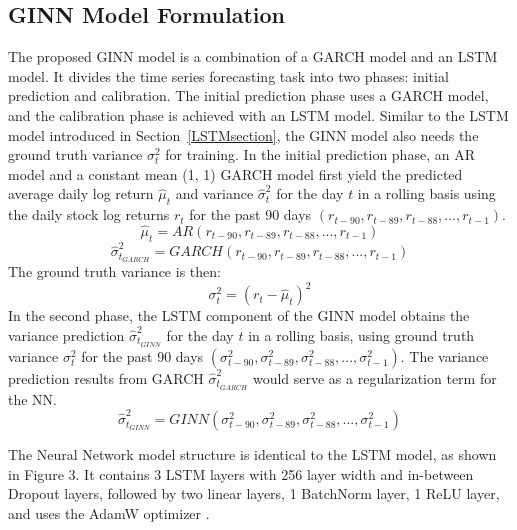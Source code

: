 \subsection{GINN Model Formulation}
The proposed GINN model is a combination of a GARCH model and an LSTM model. It divides the time series forecasting task into two phases: initial prediction and calibration. The initial prediction phase uses a GARCH model, and the calibration phase is achieved with an LSTM model. Similar to the LSTM model introduced in Section~\ref{LSTMsection}, the GINN model also needs the ground truth variance $\sigma_t^2$ for training. In the initial prediction phase, an AR model and a constant mean (1, 1) GARCH model first yield the predicted average daily log return $\hat{\mu}_t$ and variance $\hat{\sigma}_t^2$ for the day $t$ in a rolling basis using the daily stock log returns $r_t$ for the past 90 days $(r_{t-90},r_{t-89},r_{t-88},...,r_{t-1})$. 
\begin{equation}
    \hat{\mu}_t = AR (r_{t-90},r_{t-89},r_{t-88},...,r_{t-1}) 
\end{equation}
\begin{equation}
    \hat{\sigma}_{t_{GARCH}}^2 = GARCH (r_{t-90},r_{t-89},r_{t-88},...,r_{t-1}) 
\end{equation}
The ground truth variance is then: 
\begin{equation}
    \sigma_t^2 = \left( r_t - \hat{\mu}_t \right) ^2
\end{equation}
In the second phase, the LSTM component of the GINN model obtains the variance prediction $\hat{\sigma}_{t_{GINN}}^2$ for the day $t$ in a rolling basis, using ground truth variance $\sigma_t^2$ for the past 90 days $(\sigma_{t-90}^2, \sigma_{t-89}^2, \sigma_{t-88}^2,...,\sigma_{t-1}^2)$. The variance prediction results from GARCH $\hat{\sigma}_{t_{GARCH}}^2$ would serve as a regularization term for the NN. 
\begin{equation}
    \hat{\sigma}_{t_{GINN}}^2 = GINN (\sigma_{t-90}^2, \sigma_{t-89}^2, \sigma_{t-88}^2,...,\sigma_{t-1}^2) 
\end{equation}

The Neural Network model structure is identical to the LSTM model, as shown in Figure 3. It contains 3 LSTM layers with 256 layer width and in-between Dropout layers, followed by two linear layers, 1 BatchNorm layer, 1 ReLU layer, and uses the AdamW optimizer \cite{ioffe_batch_2015, agarap_deep_2018, srivastava_dropout_2014, loshchilov_decoupled_2017}. 

